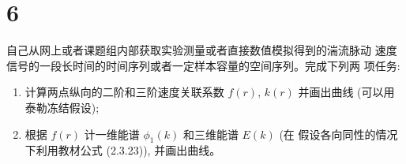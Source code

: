 \documentclass[12pt,a4]{ctexart}
\begin{document}
\section{6}

自己从网上或者课题组内部获取实验测量或者直接数值模拟得到的湍流脉动 速度信号的一段长时间的时间序列或者一定样本容量的空间序列。完成下列两 项任务:
\begin{enumerate}
   \item 计算两点纵向的二阶和三阶速度关联系数 $f(r),\, k(r)$ 并画出曲线 (可以用泰勒冻结假设);
   \item 根据 $f(r)$ 计一维能谱 $\phi_{1}(k)$ 和三维能谱 $E(k)$ (在 假设各向同性的情况下利用教材公式 (2.3.23)), 并画出曲线。
\end{enumerate}







\end{document}
